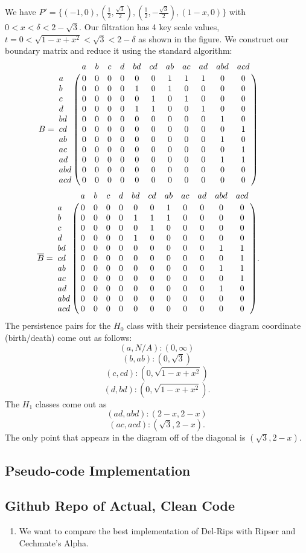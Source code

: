 \documentclass[letterpaper,titlepage]{article}
\begin{document}
We have $P' = \{(-1,0),(\frac{1}{2},\frac{\sqrt{3}}{2}),(\frac{1}{2},-\frac{\sqrt{3}}{2}),(1-x,0)\}$ with $0< x < \delta < 2-\sqrt{3}$.
Our filtration has 4 key scale values, $t = 0<\sqrt{1-x+x^2}< \sqrt{3}< 2-\delta$ as shown in the figure. We construct our boundary matrix and reduce it using the standard algorithm:
$$B=\bordermatrix{ 
    &   a & b & c & d & bd & cd & ab & ac & ad & abd & acd\cr
    a & 0 & 0 & 0 & 0 &  0 &  0 &  1 &  1 &  1 &   0 &   0 \cr
    b & 0 & 0 & 0 & 0 &  1 &  0 &  1 &  0 &  0 &   0 &   0\cr
    c & 0 & 0 & 0 & 0 &  0 &  1 &  0 &  1 &  0 &   0 &   0\cr
    d & 0 & 0 & 0 & 0 &  1 &  1 &  0 &  0 &  1 &   0 &   0\cr
   bd & 0 & 0 & 0 & 0 &  0 &  0 &  0 &  0 &  0 &   1 &   0\cr
   cd & 0 & 0 & 0 & 0 &  0 &  0 &  0 &  0 &  0 &   0 &   1\cr
   ab & 0 & 0 & 0 & 0 &  0 &  0 &  0 &  0 &  0 &   1 &   0\cr
   ac & 0 & 0 & 0 & 0 &  0 &  0 &  0 &  0 &  0 &   0 &   1\cr
   ad & 0 & 0 & 0 & 0 &  0 &  0 &  0 &  0 &  0 &   1 &   1\cr
  abd & 0 & 0 & 0 & 0 &  0 &  0 &  0 &  0 &  0 &   0 &   0\cr
  acd & 0 & 0 & 0 & 0 &  0 &  0 &  0 &  0 &  0 &   0 &   0\cr
    } \qquad$$
$$\overline{B}=\bordermatrix{ 
    &   a & b & c & d & bd & cd & ab & ac & ad & abd & acd\cr
    a & 0 & 0 & 0 & 0 &  0 &  0 &  1 &  0 &  0 &   0 &   0 \cr
    b & 0 & 0 & 0 & 0 &  1 &  1 &  1 &  0 &  0 &   0 &   0\cr
    c & 0 & 0 & 0 & 0 &  0 &  1 &  0 &  0 &  0 &   0 &   0\cr
    d & 0 & 0 & 0 & 0 &  1 &  0 &  0 &  0 &  0 &   0 &   0\cr
   bd & 0 & 0 & 0 & 0 &  0 &  0 &  0 &  0 &  0 &   1 &   1\cr
   cd & 0 & 0 & 0 & 0 &  0 &  0 &  0 &  0 &  0 &   0 &   1\cr
   ab & 0 & 0 & 0 & 0 &  0 &  0 &  0 &  0 &  0 &   1 &   1\cr
   ac & 0 & 0 & 0 & 0 &  0 &  0 &  0 &  0 &  0 &   0 &   1\cr
   ad & 0 & 0 & 0 & 0 &  0 &  0 &  0 &  0 &  0 &   1 &   0\cr
  abd & 0 & 0 & 0 & 0 &  0 &  0 &  0 &  0 &  0 &   0 &   0\cr
  acd & 0 & 0 & 0 & 0 &  0 &  0 &  0 &  0 &  0 &   0 &   0\cr
    }. \qquad$$
The persistence pairs for the $H_0$ class with their persistence diagram coordinate (birth/death) come out as follows:
$$(a,N/A): (0,\infty)$$
$$(b,ab): (0,\sqrt{3})$$
$$(c, cd): (0,\sqrt{1-x+x^2})$$
$$(d, bd): (0,\sqrt{1-x+x^2}).$$
The $H_1$ classes come out as
$$(ad, abd): (2-x, 2-x)$$
$$(ac, acd): (\sqrt{3}, 2-x).$$
The only point that appears in the diagram off of the diagonal is $(\sqrt{3}, 2-x).$


\subsection{Pseudo-code Implementation}

\subsection{Github Repo of Actual, Clean Code}
\begin{enumerate}
    \item We want to compare the best implementation of Del-Rips with Ripser and Cechmate's Alpha.
\end{enumerate}
\end{document}
